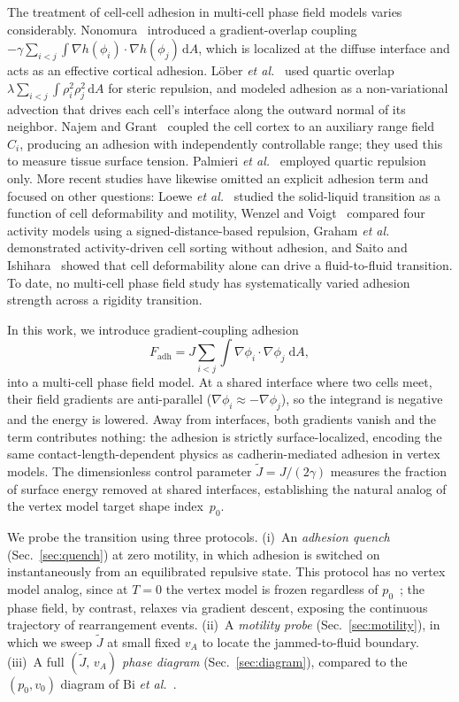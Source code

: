\documentclass[aps,pre,twocolumn,superscriptaddress,longbibliography]{revtex4-2}
\newcommand{\dd}{\mathrm{d}}               %
\newcommand{\vA}{v_{\!A}}                  %
\newcommand{\Jk}{\tilde{J}}                %
\newcommand{\phii}{\phi_i}                 %
\newcommand{\phij}{\phi_j}                 %
\begin{document}
The treatment of cell-cell adhesion in multi-cell phase field models varies
considerably.
Nonomura~\cite{Nonomura2012} introduced a gradient-overlap coupling
$-\gamma\sum_{i<j}\!\int\! \nabla h(\phii)\!\cdot\!\nabla h(\phij)\,\dd A$,
which is localized at the diffuse interface and acts as an effective cortical
adhesion.
L\"ober \textit{et al.}~\cite{Lober2015} used quartic overlap
$\lambda\sum_{i<j}\!\int\!\rho_i^2\rho_j^2\,\dd A$ for steric repulsion, and modeled adhesion as a
non-variational advection that drives each cell's interface along the
outward normal of its neighbor.
Najem and Grant~\cite{Najem2016} coupled the cell cortex to an auxiliary
range field~$C_i$, producing an adhesion with independently controllable
range; they used this to measure tissue surface tension.
Palmieri \textit{et al.}~\cite{Palmieri2015} employed quartic repulsion
only.
More recent studies have likewise omitted an explicit adhesion term and
focused on other questions:
Loewe \textit{et al.}~\cite{Loewe2020} studied the solid-liquid transition
as a function of cell deformability and motility,
Wenzel and Voigt~\cite{Wenzel2021} compared four activity models using a
signed-distance-based repulsion,
Graham \textit{et al.}~\cite{Graham2024} demonstrated activity-driven cell
sorting without adhesion, and
Saito and Ishihara~\cite{Saito2024} showed that cell deformability alone
can drive a fluid-to-fluid transition.
To date, no multi-cell phase field study has systematically varied adhesion
strength across a rigidity transition.

In this work, we introduce gradient-coupling adhesion
%
\begin{equation}
  F_{\mathrm{adh}} = J\sum_{i<j}\int \nabla\phii\cdot\nabla\phij\;\dd A,
  \label{eq:adhesion-intro}
\end{equation}
%
into a multi-cell phase field model.  At a shared interface where two
cells meet, their field gradients are anti-parallel
($\nabla\phii \approx -\nabla\phij$), so the integrand is negative and
the energy is lowered.  Away from interfaces, both gradients vanish and
the term contributes nothing: the adhesion is strictly
surface-localized, encoding the same contact-length-dependent physics
as cadherin-mediated adhesion in vertex models.  The dimensionless
control parameter $\Jk = J/(2\gamma)$ measures the fraction of surface
energy removed at shared interfaces, establishing the natural analog
of the vertex model target shape index~$p_0$.

We probe the transition using three protocols.
(i)~An \emph{adhesion quench} (Sec.~\ref{sec:quench}) at zero motility,
in which adhesion is switched on instantaneously from an equilibrated
repulsive state.  This protocol has no vertex model analog, since at
$T = 0$ the vertex model is frozen regardless of
$p_0$~\cite{Bi2015}; the phase field, by contrast, relaxes via gradient
descent, exposing the continuous trajectory of rearrangement events.
(ii)~A \emph{motility probe} (Sec.~\ref{sec:motility}), in which we sweep
$\Jk$ at small fixed $\vA$ to locate the jammed-to-fluid boundary.
(iii)~A full \emph{$(\Jk,\,\vA)$ phase diagram}
(Sec.~\ref{sec:diagram}), compared to the $(p_0, v_0)$ diagram of
Bi \textit{et al.}~\cite{Bi2016}.
\end{document}
